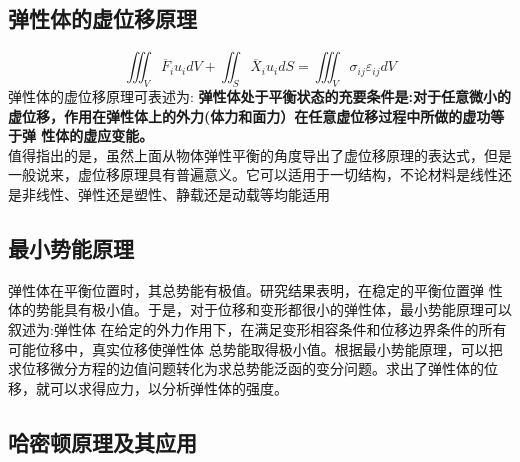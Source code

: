 \documentclass{book}
\begin{document}
\subsection{弹性体的虚位移原理}
\begin{equation}
 \iiint_V \overline{F}_i u_i dV + \iint_S \overline{X}_i u_i dS = \iiint_V \sigma_{ij} \varepsilon_{ij} dV
\end{equation}
弹性体的虚位移原理可表述为:
\textbf{弹性体处于平衡状态的充要条件是:对于任意微小的虚位移，作用在弹性体上的外力(体力和面力）在任意虚位移过程中所做的虚功等于弹
性体的虚应变能。}
\\
值得指出的是，虽然上面从物体弹性平衡的角度导出了虚位移原理的表达式，但是一般说来，虚位移原理具有普遍意义。它可以适用于一切结构，不论材料是线性还是非线性、弹性还是塑性、静载还是动载等均能适用

\subsection{最小势能原理}
弹性体在平衡位置时，其总势能有极值。研究结果表明，在稳定的平衡位置弹 性体的势能具有极小值。于是，对于位移和变形都很小的弹性体，最小势能原理可以叙述为:弹性体 在给定的外力作用下，在满足变形相容条件和位移边界条件的所有可能位移中，真实位移使弹性体 总势能取得极小值。根据最小势能原理，可以把求位移微分方程的边值问题转化为求总势能泛函的变分问题。求出了弹性体的位移，就可以求得应力，以分析弹性体的强度。

\subsection{哈密顿原理及其应用}
\end{document}
